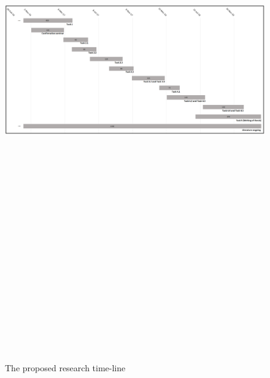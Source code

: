 \documentclass[a4paper,11pt]{article}
\begin{document}
\begin{figure}[ht]
	\centering
		\includegraphics[angle=90,width=17cm,height=25cm]{pic/timeline.png}
	\caption{The proposed research time-line}
	\label{fig:timeline}
\end{figure}
\end{document}
